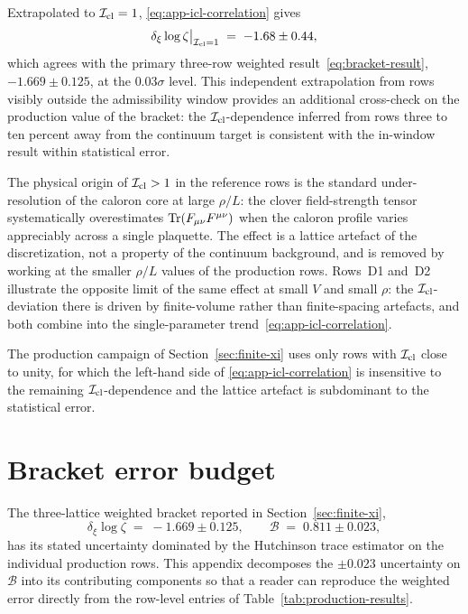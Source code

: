 \documentclass[a4paper,11pt]{article}
\theoremstyle{definition}
\newcommand{\Tr}{\mathop{\rm Tr}}
\newcommand{\Icl}{\mathcal{I}_{\rm cl}}
\newcommand{\Bobs}{\mathcal{B}}
\begin{document}
Extrapolated to $\Icl = 1$, \eqref{eq:app-icl-correlation} gives
\begin{equation}
\delta_\xi \log\zeta\bigr|_{\Icl = 1}
\;=\; -1.68 \pm 0.44,
\label{eq:app-icl-extrap}
\end{equation}
which agrees with the primary three-row weighted
result~\eqref{eq:bracket-result}, $-1.669 \pm 0.125$, at the
$0.03\sigma$ level. This independent extrapolation from rows
visibly outside the admissibility window provides an additional
cross-check on the production value of the bracket: the
$\Icl$-dependence inferred from rows three to ten percent away from
the continuum target is consistent with the in-window result within
statistical error.


The physical origin of $\Icl > 1$ in the reference rows is the standard
under-resolution of the caloron core at large $\rho/L$: the clover
field-strength tensor systematically overestimates
$\Tr(F_{\mu\nu}F^{\mu\nu})$ when the caloron profile varies appreciably
across a single plaquette. The effect is a lattice artefact of the
discretization, not a property of the continuum background, and is
removed by working at the smaller $\rho/L$ values of the production
rows. Rows~D1 and~D2 illustrate the opposite limit of the same effect
at small $V$ and small $\rho$: the $\Icl$-deviation there is driven by
finite-volume rather than finite-spacing artefacts, and both combine
into the single-parameter trend~\eqref{eq:app-icl-correlation}.

The production campaign of Section~\ref{sec:finite-xi} uses only rows
with $\Icl$ close to unity, for which the left-hand side of
\eqref{eq:app-icl-correlation} is insensitive to the remaining
$\Icl$-dependence and the lattice artefact is subdominant to the
statistical error.



\section{Bracket error budget}
\label{app:error-budget}

The three-lattice weighted bracket reported in Section~\ref{sec:finite-xi},
\begin{equation}
\delta_\xi \log\zeta \;=\; -1.669 \pm 0.125,
\qquad
\Bobs \;=\; 0.811 \pm 0.023,
\label{eq:app-bracket-weighted}
\end{equation}
has its stated uncertainty dominated by the Hutchinson trace estimator on
the individual production rows. This appendix decomposes the $\pm 0.023$
uncertainty on $\Bobs$ into its contributing components so that a reader
can reproduce the weighted error directly from the row-level entries of
Table~\ref{tab:production-results}.
\end{document}
